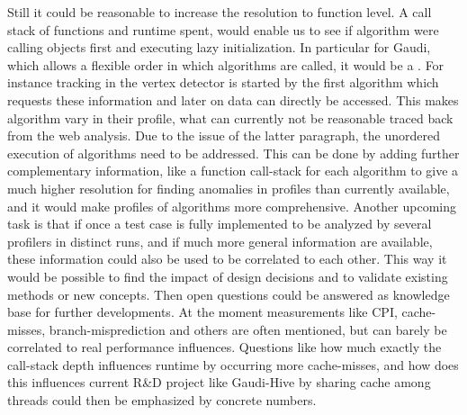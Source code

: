 \documentclass[a4paper]{jpconf}
\begin{document}
Still it could be reasonable to increase the resolution to function level. A call stack of functions and runtime spent, would enable us to see if algorithm were calling objects first and executing lazy initialization. In particular for Gaudi, which allows a flexible order in which algorithms are called, it would be a . For instance tracking in the vertex detector is started by the first algorithm which requests these information and later on data can directly be accessed. This makes algorithm vary in their profile, what can currently not be reasonable traced back from the web analysis.
\newline
Due to the issue of the latter paragraph, the unordered execution of algorithms need to be addressed. This can be done by adding further complementary information, like a function call-stack for each algorithm to give a much higher resolution for finding anomalies in profiles than currently available, and it would make profiles of algorithms more comprehensive.
\newline
Another upcoming task is that if once a test case is fully implemented to be analyzed by several profilers in distinct runs, and if much more general information are available, these information could also be used to be correlated to each other. This way it would be possible to find the impact of design decisions and to validate existing methods or new concepts. Then open questions could be answered as knowledge base for further developments.
\newline
At the moment measurements like CPI, cache-misses, branch-misprediction and others are often mentioned, but can barely be correlated to real performance influences. Questions like how much exactly the call-stack depth influences runtime by occurring more cache-misses, and how does this influences current R\&D project like Gaudi-Hive by sharing cache among threads could then be emphasized by concrete numbers.

\end{document}
